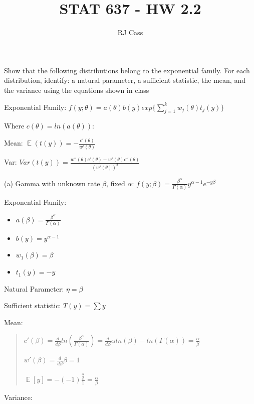 \documentclass{article}
\author{RJ Cass}
\title{STAT 637 - HW 2.2}
\DeclareMathOperator{\EX}{\mathbb{E}} %
\let\Oldsum=\sum
\renewcommand{\sum}{\Oldsum\limits}
\begin{document}
\maketitle


\section{}

Show that the following distributions belong to the exponential family. For each distribution, identify: a natural parameter, a sufficient statistic, the mean, and the variance using the equations shown in class

Exponential Family: $f(y; \theta) = a(\theta)b(y)exp\{\sum_{j=1}^k w_j(\theta) t_j(y) \}$

Where $c(\theta) = ln(a(\theta))$:

Mean: $\EX(t(y)) = -\frac{c'(\theta)}{w'(\theta)}$

Var: $Var(t(y)) = \frac{w''(\theta)c'(\theta) - w'(\theta)c''(\theta)}{(w'(\theta))^3}$

(a) Gamma with unknown rate $\beta$, fixed $\alpha$: $f(y; \beta) = \frac{\beta^{\alpha}}{\Gamma(\alpha)}y^{\alpha-1}e^{-y\beta}$

Exponential Family: 
\begin{itemize}
    \item $a(\beta) = \frac{\beta^{\alpha}}{\Gamma(\alpha)}$
    \item $b(y) = y^{\alpha-1}$
    \item $w_1(\beta) = \beta$
    \item $t_1(y) = -y$
\end{itemize}

Natural Parameter: $\eta = \beta$

Sufficient statistic: $T(y) = \sum y$

Mean: 

\begin{quote}
$c'(\beta) = \frac{d}{d \beta} ln(\frac{\beta^{\alpha}}{\Gamma(\alpha)}) = \frac{d}{d \beta} \alpha ln(\beta) - ln(\Gamma(\alpha)) = \frac{\alpha}{\beta}$

$w'(\beta) = \frac{d}{d \beta} \beta = 1$

$\EX[y] = -(-1)\frac{\frac{\alpha}{\beta}}{1} = \frac{\alpha}{\beta}$
\end{quote}

Variance: 
\end{document}
